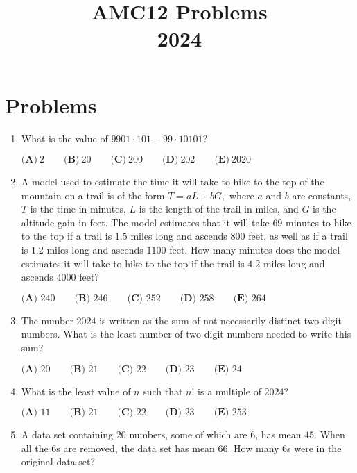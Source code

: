 \documentclass{article}
\title{AMC12 Problems \\ 2024}
\date{}
\begin{document}
\maketitle\thispagestyle{fancy}\newpage\section*{Problems}\begin{enumerate}[label=\arabic*., itemsep=0.5em]\item What is the value of $9901\cdot101-99\cdot10101?$

$\textbf{(A)}~2\qquad\textbf{(B)}~20\qquad\textbf{(C)}~200\qquad\textbf{(D)}~202\qquad\textbf{(E)}~2020$\par \vspace{0.5em}\item A model used to estimate the time it will take to hike to the top of the mountain on a trail is of the form $T=aL+bG,$ where $a$ and $b$ are constants, $T$ is the time in minutes, $L$ is the length of the trail in miles, and $G$ is the altitude gain in feet. The model estimates that it will take $69$ minutes to hike to the top if a trail is $1.5$ miles long and ascends $800$ feet, as well as if a trail is $1.2$ miles long and ascends $1100$ feet. How many minutes does the model estimates it will take to hike to the top if the trail is $4.2$ miles long and ascends $4000$ feet?

$\textbf{(A) }240\qquad\textbf{(B) }246\qquad\textbf{(C) }252\qquad\textbf{(D) }258\qquad\textbf{(E) }264$\par \vspace{0.5em}\item The number $2024$ is written as the sum of not necessarily distinct two-digit numbers. What is the least number of two-digit numbers needed to write this sum?

$\textbf{(A) }20\qquad\textbf{(B) }21\qquad\textbf{(C) }22\qquad\textbf{(D) }23\qquad\textbf{(E) }24$\par \vspace{0.5em}\item What is the least value of $n$ such that $n!$ is a multiple of $2024$?

$
\textbf{(A) }11 \qquad
\textbf{(B) }21 \qquad
\textbf{(C) }22 \qquad
\textbf{(D) }23 \qquad
\textbf{(E) }253 \qquad
$\par \vspace{0.5em}\item A data set containing $20$ numbers, some of which are $6$, has mean $45$. When all the 6s are removed, the data set has mean $66$. How many 6s were in the original data set?


\end{enumerate}
\end{document}
